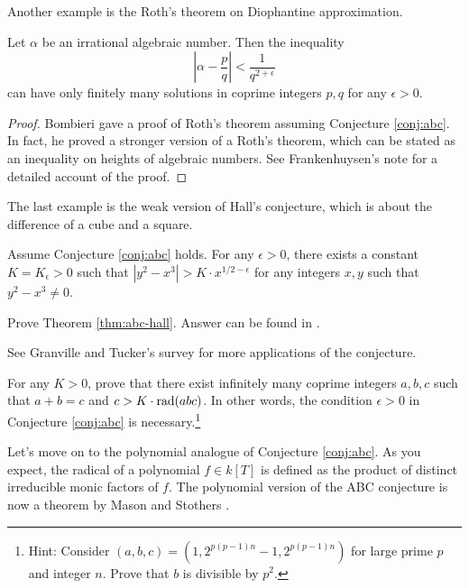 Another example is the Roth's theorem on Diophantine approximation.
\begin{theorem}
    Let $\alpha$ be an irrational algebraic number.
    Then the inequality
    \[
    \left| \alpha - \frac{p}{q} \right| < \frac{1}{q^{2 + \epsilon}}
    \]
    can have only finitely many solutions in coprime integers \( p, q \) for any \( \epsilon > 0 \).
\end{theorem}
\begin{proof}
    Bombieri \cite{bombieri1994roth} gave a proof of Roth's theorem assuming Conjecture \ref{conj:abc}.
    In fact, he proved a stronger version of a Roth's theorem, which can be stated as an inequality on heights of algebraic numbers.
    See Frankenhuysen's note \cite{frankenhuysen} for a detailed account of the proof.
\end{proof}

The last example is the weak version of Hall's conjecture, which is about the difference of a cube and a square.
\begin{theorem}
    \label{thm:abc-hall}
    Assume Conjecture \ref{conj:abc} holds.
    For any \( \epsilon > 0 \), there exists a constant \( K = K_\epsilon > 0 \) such that \( | y^2 - x^3 | > K \cdot x^{1 / 2 - \epsilon} \) for any  integers \( x, y \) such that \( y^2 - x^3 \ne 0 \).
\end{theorem}

\begin{exercise}
    Prove Theorem \ref{thm:abc-hall}.
    Answer can be found in \cite{schmidt2006diophantine}.
\end{exercise}

See Granville and Tucker's survey \cite{granville2002s} for more applications of the conjecture.

\begin{exercise}
    For any $K > 0$, prove that there exist infinitely many coprime integers \( a, b, c \) such that \( a + b = c \) and \( c > K \cdot \mathrm{rad}(abc) \).
    In other words, the condition \( \epsilon > 0 \) in Conjecture \ref{conj:abc} is necessary.\footnote{Hint: Consider \( (a, b, c) = (1, 2^{p(p-1)n} - 1, 2^{p(p-1)n})\) for large prime \( p \) and integer \( n \). Prove that \( b \) is divisible by \( p^2 \).}
\end{exercise}

Let's move on to the polynomial analogue of Conjecture \ref{conj:abc}.
As you expect, the radical of a polynomial \( f \in k[T] \) is defined as the product of distinct irreducible monic factors of \( f \).
The polynomial version of the ABC conjecture is now a theorem by Mason and Stothers \cite{mason1984diophantine,stothers1981polynomial}.

